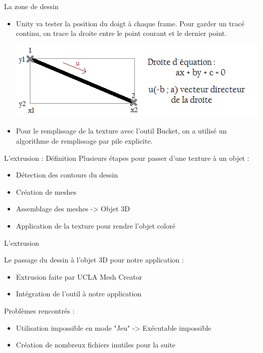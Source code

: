 \documentclass[a4paper,10pt]{beamer}
\begin{document}
	\begin{frame}{La zone de dessin}
		\begin{itemize}
		\item Unity va tester la position du doigt à chaque frame.
		Pour garder un tracé continu, on trace la droite entre le point courant et le dernier point.
		\centerline{\includegraphics[scale=0.4]{images/intro/trait.png}}
		
		\item Pour le remplissage de la texture avec l'outil Bucket, on a utilisé un algorithme de remplissage par pile explicite.
	\end{itemize}
	\end{frame}
	
	\begin{frame}{L'extrusion : Définition}
		Plusieurs étapes pour passer d'une texture à un objet :
		\begin{itemize}
			\item Détection des contours du dessin
			\item Création de meshes
			\item Assemblage des meshes -> Objet 3D
			\item Application de la texture pour rendre l'objet coloré
		\end{itemize}
	
	\end{frame}
		
	\begin{frame}{L'extrusion}
		
		Le passage du dessin à l'objet 3D pour notre application :
		\begin{itemize}
			\item Extrusion faite par UCLA Mesh Creator
			\item Intégration de l'outil à notre application
		\end{itemize}
		\medbreak
		Problèmes rencontrés :
		\begin{itemize}
			\item Utilisation impossible en mode "Jeu" -> Exécutable impossible
			\item Création de nombreux fichiers inutiles pour la suite
		\end{itemize}
	\end{frame}
	
\end{document}
